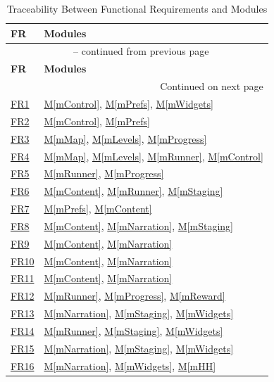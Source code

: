 \documentclass[10pt, titlepage]{article}
\newcommand{\srsurl}{https://team-hindsight.github.io/ophthamology-game/SRS/SRS.pdf}
\newcommand{\srsitemref}[2]{\href{\srsurl\#nameddest=#1}{#2}}
\newcommand{\mref}[1]{\texorpdfstring{\hyperref[md:#1]{M\ref*{#1}}}{M\ref*{#1}}}
\begin{document}
\begin{longtable}{@{}p{}p{}@{}}
\caption{Traceability Between Functional Requirements and Modules}\label{TblFRModules}\\
\toprule
\textbf{FR} & \textbf{Modules} \\
\midrule
\endfirsthead
\multicolumn{2}{c}{\tablename\ \thetable{} -- continued from previous page} \\
\toprule
\textbf{FR} & \textbf{Modules} \\
\midrule
\endhead
\midrule
\multicolumn{2}{r}{Continued on next page} \\
\endfoot
\bottomrule
\endlastfoot

\srsitemref{FR_MedicalNotice}{FR1} & \mref{mControl}, \mref{mPrefs}, \mref{mWidgets} \\
\srsitemref{FR_RecordAck}{FR2} & \mref{mControl}, \mref{mPrefs} \\
\srsitemref{FR_JourneyMap}{FR3} & \mref{mMap}, \mref{mLevels}, \mref{mProgress} \\
\srsitemref{FR_StartLevel}{FR4} & \mref{mMap}, \mref{mLevels}, \mref{mRunner}, \mref{mControl} \\
\srsitemref{FR_Replay}{FR5} & \mref{mRunner}, \mref{mProgress} \\
\srsitemref{FR_LevelContent}{FR6} & \mref{mContent}, \mref{mRunner}, \mref{mStaging} \\
\srsitemref{FR_AgeGroup}{FR7} & \mref{mPrefs}, \mref{mContent} \\
\srsitemref{FR_DescribeSensations}{FR8} & \mref{mContent}, \mref{mNarration}, \mref{mStaging} \\
\srsitemref{FR_TruthfulSensations}{FR9} & \mref{mContent}, \mref{mNarration} \\
\srsitemref{FR_ClinicsDiffer}{FR10} & \mref{mContent}, \mref{mNarration} \\
\srsitemref{FR_SpeakUp}{FR11} & \mref{mContent}, \mref{mNarration} \\
\srsitemref{FR_LevelEnd}{FR12} & \mref{mRunner}, \mref{mProgress}, \mref{mReward} \\
\srsitemref{FR_SpokenInstructions}{FR13} & \mref{mNarration}, \mref{mStaging}, \mref{mWidgets} \\
\srsitemref{FR_HintOnMiss}{FR14} & \mref{mRunner}, \mref{mStaging}, \mref{mWidgets} \\
\srsitemref{FR_VisualCues}{FR15} & \mref{mNarration}, \mref{mStaging}, \mref{mWidgets} \\
\srsitemref{FR_NarrationFallback}{FR16} & \mref{mNarration}, \mref{mWidgets}, \mref{mHH} \\

\end{longtable}
\end{document}
